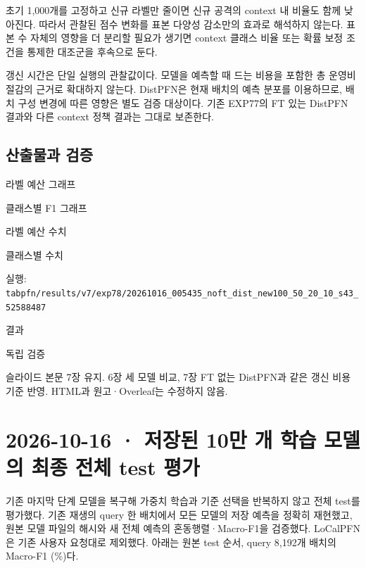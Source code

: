 초기 1,000개를 고정하고 신규 라벨만 줄이면 신규 공격의 context 내 비율도 함께 낮아진다. 따라서 관찰된 점수 변화를 표본 다양성 감소만의 효과로 해석하지 않는다. 표본 수 자체의 영향을 더 분리할 필요가 생기면 context 클래스 비율 또는 확률 보정 조건을 통제한 대조군을 후속으로 둔다.

갱신 시간은 단일 실행의 관찰값이다. 모델을 예측할 때 드는 비용을 포함한 총 운영비 절감의 근거로 확대하지 않는다. DistPFN은 현재 배치의 예측 분포를 이용하므로, 배치 구성 변경에 따른 영향은 별도 검증 대상이다. 기존 EXP77의 FT 있는 DistPFN 결과와 다른 context 정책 결과는 그대로 보존한다.

\subsection{산출물과 검증}
\par\noindent \textbullet\enspace 라벨 예산 그래프


\par\noindent \textbullet\enspace 클래스별 F1 그래프


\par\noindent \textbullet\enspace 라벨 예산 수치


\par\noindent \textbullet\enspace 클래스별 수치


\par\noindent \textbullet\enspace 실행: \texttt{tabpfn/\allowbreak{}\allowbreak{}r\allowbreak{}esults/\allowbreak{}\allowbreak{}v\allowbreak{}7/\allowbreak{}\allowbreak{}exp78/\allowbreak{}\allowbreak{}20261016\allowbreak{}\_\allowbreak{}\allowbreak{}005435\_\allowbreak{}\allowbreak{}noft\_\allowbreak{}\allowbreak{}dis\allowbreak{}t\_\allowbreak{}\allowbreak{}new100\allowbreak{}\_\allowbreak{}\allowbreak{}50\_\allowbreak{}\allowbreak{}20\_\allowbreak{}\allowbreak{}1\allowbreak{}0\_\allowbreak{}\allowbreak{}s43\_\allowbreak{}\allowbreak{}52\allowbreak{}588487}


\par\noindent \textbullet\enspace 결과


\par\noindent \textbullet\enspace 독립 검증


\par\noindent \textbullet\enspace 슬라이드 본문 7장 유지. 6장 세 모델 비교, 7장 FT 없는 DistPFN과 같은 갱신 비용 기준 반영. HTML과 원고·Overleaf는 수정하지 않음.




\section{2026-10-16 · 저장된 10만 개 학습 모델의 최종 전체 test 평가}
\label{report:20261016_exp79_results}
기존 마지막 단계 모델을 복구해 가중치 학습과 기준 선택을 반복하지 않고 전체 test를 평가했다. 기존 재생의 query 한 배치에서 모든 모델의 저장 예측을 정확히 재현했고, 원본 모델 파일의 해시와 새 전체 예측의 혼동행렬·Macro-F1을 검증했다. LoCalPFN은 기존 사용자 요청대로 제외했다. 아래는 원본 test 순서, query 8,192개 배치의 Macro-F1 (\%)다.

